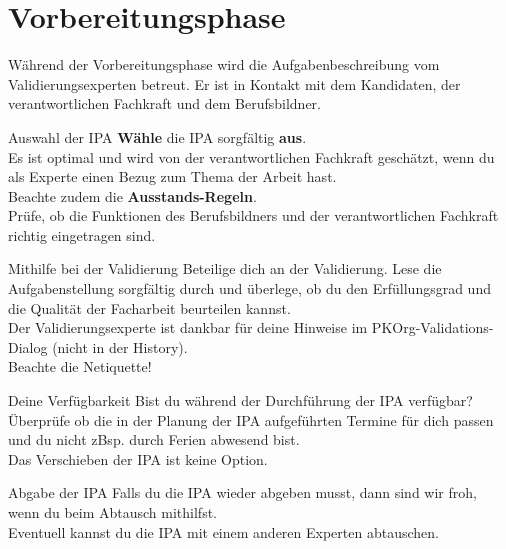 \section{Vorbereitungsphase}
Während der Vorbereitungsphase wird die Aufgabenbeschreibung vom Validierungsexperten betreut. Er ist in Kontakt mit dem Kandidaten, der verantwortlichen Fachkraft und dem Berufsbildner.
\begin{taskitemwithoutcomment}{Auswahl der IPA}
  \textbf{Wähle} die IPA sorgfältig \textbf{aus}.\\Es ist optimal und wird von der verantwortlichen Fachkraft geschätzt, wenn du als Experte einen Bezug zum Thema der Arbeit hast.\\Beachte zudem die \textbf{Ausstands-Regeln}.\\Prüfe, ob die Funktionen des Berufsbildners und der verantwortlichen Fachkraft richtig eingetragen sind.
\end{taskitemwithoutcomment}
\begin{taskitem}{Mithilfe bei der Validierung}
  Beteilige dich an der Validierung. Lese die Aufgabenstellung sorgfältig durch und überlege, ob du den Erfüllungsgrad und die Qualität der Facharbeit beurteilen kannst.\\Der Validierungsexperte ist dankbar für deine Hinweise im PKOrg-Validations-Dialog (nicht in der History).\\Beachte die Netiquette!
\end{taskitem}
\begin{taskitemwithoutcomment}{Deine Verfügbarkeit}
  Bist du während der Durchführung der IPA verfügbar?\\Überprüfe ob die in der Planung der IPA aufgeführten Termine für dich passen und du nicht zBsp. durch Ferien abwesend bist.\\Das Verschieben der IPA ist keine Option.
\end{taskitemwithoutcomment}
\begin{taskitemwithoutcomment}{Abgabe der IPA}
  Falls du die IPA wieder abgeben musst, dann sind wir froh, wenn du beim Abtausch mithilfst.\\Eventuell kannst du die IPA mit einem anderen Experten abtauschen.
\end{taskitemwithoutcomment}